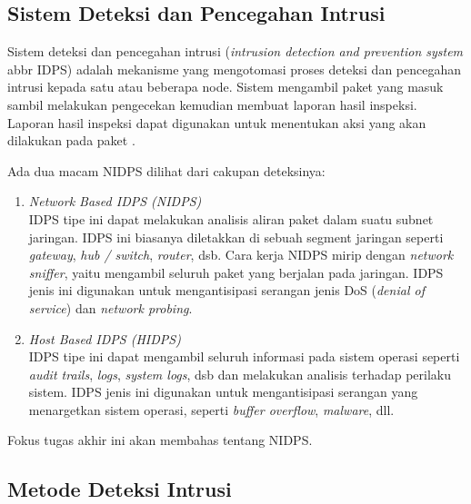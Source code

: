   \subsection{Sistem Deteksi dan Pencegahan Intrusi}

    Sistem deteksi dan pencegahan intrusi (\emph{intrusion detection and prevention system} abbr IDPS) adalah mekanisme yang mengotomasi proses deteksi dan pencegahan intrusi kepada satu atau beberapa node. Sistem mengambil paket yang masuk sambil melakukan pengecekan kemudian membuat laporan hasil inspeksi. Laporan hasil inspeksi dapat digunakan untuk menentukan aksi yang akan dilakukan pada paket \citep{nist2007}.

    Ada dua macam NIDPS dilihat dari cakupan deteksinya:
    \begin{enumerate}

      \item 
      \emph{Network Based IDPS (NIDPS)} \\
      IDPS tipe ini dapat melakukan analisis aliran paket dalam suatu subnet jaringan. IDPS ini biasanya diletakkan di sebuah segment jaringan seperti \emph{gateway}, \emph{hub / switch}, \emph{router}, dsb. Cara kerja NIDPS mirip dengan \emph{network sniffer}, yaitu mengambil seluruh paket yang berjalan pada jaringan. IDPS jenis ini digunakan untuk mengantisipasi serangan jenis DoS (\emph{denial of service}) dan \emph{network probing}.

       \item 
      \emph{Host Based IDPS (HIDPS)} \\
      IDPS tipe ini dapat mengambil seluruh informasi pada sistem operasi seperti \emph{audit trails}, \emph{logs}, \emph{system logs}, dsb dan melakukan analisis terhadap perilaku sistem. IDPS jenis ini digunakan untuk mengantisipasi serangan yang menargetkan sistem operasi, seperti \emph{buffer overflow}, \emph{malware}, dll.

    \end{enumerate}

    Fokus tugas akhir ini akan membahas tentang NIDPS.

  \subsection{Metode Deteksi Intrusi}


